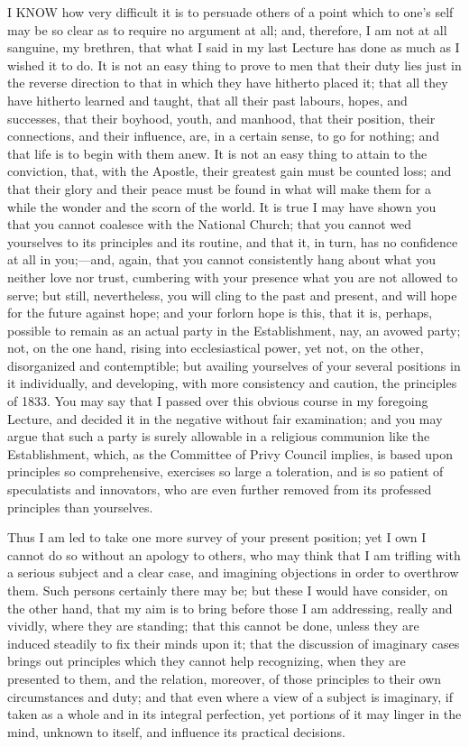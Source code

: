 I KNOW how very difficult it is to persuade others of a point which
to one's self may be so clear as to require no argument at all; and,
therefore, I am not at all sanguine, my brethren, that what I said in
my last Lecture has done as much as I wished it to do. It is not an
easy thing to prove to men that their duty lies just in the reverse
direction to that in which they have hitherto placed it; that all they
have hitherto learned and taught, that all their past labours, hopes,
and successes, that their boyhood, youth, and manhood, that their
position, their connections, and their influence, are, in a certain
sense, to go for nothing; and that life is to begin with them anew. It
is not an easy thing to attain to the conviction, that, with the
Apostle, their greatest gain must be counted loss; and that their
glory and their peace must be found in what will make them for a while
the wonder and the scorn of the world. It is true I may have shown you
that you cannot coalesce with the National Church; that you cannot wed
yourselves to its principles and its routine, and that it, in turn,
has no confidence at all in you;—and, again, that you cannot
consistently hang about what you neither love nor trust, cumbering
with your presence what you are not allowed to serve; but still,
nevertheless, you will cling to the past and present, and will hope
for the future against hope; and your forlorn hope is this, that it
is, perhaps, possible to remain as an actual party in the
Establishment, nay, an avowed party; not, on the one hand, rising into
ecclesiastical power, yet not, on the other, disorganized and
contemptible; but availing yourselves of your several positions in it
individually, and developing, with more consistency and caution, the
principles of 1833. You may say that I passed over this obvious course
in my foregoing Lecture, and decided it in the negative without fair
examination; and you may argue that such a party is surely allowable
in a religious communion like the Establishment, which, as the
Committee of Privy Council implies, is based upon principles so
comprehensive, exercises so large a toleration, and is so patient of
speculatists and innovators, who are even further removed from its
professed principles than yourselves.

Thus I am led to take one more survey of your present position; yet
I own I cannot do so without an apology to others, who may think that
I am trifling with a serious subject and a clear case, and imagining
objections in order to overthrow them. Such persons certainly there
may be; but these I would have consider, on the other hand, that my
aim is to bring before those I am addressing, really and vividly,
where they are standing; that this cannot be done, unless they are
induced steadily to fix their minds upon it; that the discussion of
imaginary cases brings out principles which they cannot help
recognizing, when they are presented to them, and the relation,
moreover, of those principles to their own circumstances and duty; and
that even where a view of a subject is imaginary, if taken as a whole
and in its integral perfection, yet portions of it may linger in the
mind, unknown to itself, and influence its practical decisions.

